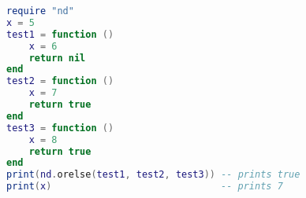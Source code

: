 \begin{lstlisting}[language=lua, caption={Using \texttt{nd.orelse}.}, label=lst:orelse, name=lst:orelse]
require "nd"
x = 5
test1 = function ()
	x = 6
	return nil
end
test2 = function ()
	x = 7
	return true
end
test3 = function ()
	x = 8
	return true
end
print(nd.orelse(test1, test2, test3)) -- prints true
print(x)                              -- prints 7
\end{lstlisting}

\begin{comment}
TODO: Include reference to the usage of nd.whatif in distributed
\end{comment}
